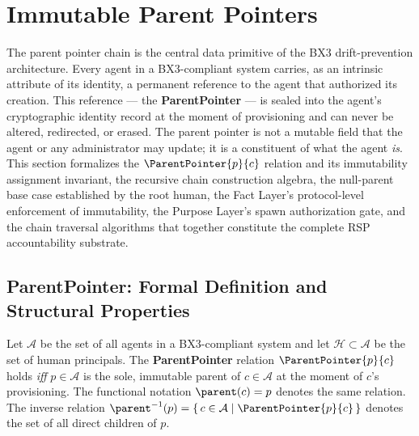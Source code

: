 
\section{Immutable Parent Pointers}
\label{sec:immutable_parent_pointers}

The parent pointer chain is the central data primitive of the BX3 drift-prevention architecture. Every agent in a BX3-compliant system carries, as an intrinsic attribute of its identity, a permanent reference to the agent that authorized its creation. This reference — the \textbf{ParentPointer} — is sealed into the agent's cryptographic identity record at the moment of provisioning and can never be altered, redirected, or erased. The parent pointer is not a mutable field that the agent or any administrator may update; it is a constituent of what the agent \emph{is}. This section formalizes the $\ParentPointer{p}{c}$ relation and its immutability assignment invariant, the recursive chain construction algebra, the null-parent base case established by the root human, the Fact Layer's protocol-level enforcement of immutability, the Purpose Layer's spawn authorization gate, and the chain traversal algorithms that together constitute the complete RSP accountability substrate.

\subsection{ParentPointer: Formal Definition and Structural Properties}
\label{sec:parent_pointer_def}

\begin{definition}[ParentPointer]
\label{def:parent_pointer}
Let $\mathcal{A}$ be the set of all agents in a BX3-compliant system and let $\mathcal{H} \subset \mathcal{A}$ be the set of human principals. The \textbf{ParentPointer} relation $\ParentPointer{p}{c}$ holds \emph{iff} $p \in \mathcal{A}$ is the sole, immutable parent of $c \in \mathcal{A}$ at the moment of $c$'s provisioning. The functional notation $\parent(c) = p$ denotes the same relation. The inverse relation $\parent^{-1}(p) = \{\, c \in \mathcal{A} \mid \ParentPointer{p}{c} \,\}$ denotes the set of all direct children of $p$.
\end{definition}

